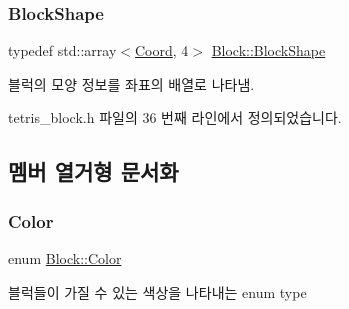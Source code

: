 \subsubsection{\texorpdfstring{Block\+Shape}{BlockShape}}
{\footnotesize\ttfamily typedef std\+::array$<$\mbox{\hyperlink{struct_coord}{Coord}}, 4$>$ \mbox{\hyperlink{class_block_aca5d951639f113e2ebd7856209d6b9ab}{Block\+::\+Block\+Shape}}\hspace{0.3cm}{\ttfamily [inherited]}}



블럭의 모양 정보를 좌표의 배열로 나타냄. 



tetris\+\_\+block.\+h 파일의 36 번째 라인에서 정의되었습니다.



\subsection{멤버 열거형 문서화}
\mbox{\label{class_block_ad054b4ac51df79aa910040b2a2fdf7b5}} 
\subsubsection{\texorpdfstring{Color}{Color}}
{\footnotesize\ttfamily enum \mbox{\hyperlink{class_block_ad054b4ac51df79aa910040b2a2fdf7b5}{Block\+::\+Color}}\hspace{0.3cm}{\ttfamily [inherited]}}



블럭들이 가질 수 있는 색상을 나타내는 enum type 

